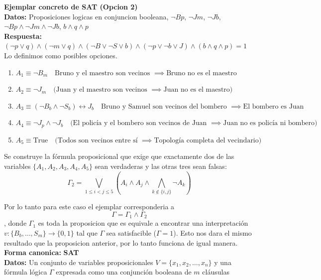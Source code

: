 \begin{enumerate}[label=\arabic*., leftmargin=*]
    \textbf{Ejemplar concreto de SAT (Opcion 2)}\\
    \textbf{Datos:} Proposiciones logicas en conjuncion booleana, $\neg Bp$, $\neg Jm$, $\neg Jb$, $\neg Bp \wedge \neg Jm \wedge \neg Jb$, $b \wedge q \wedge p$\\
    \textbf{Respuesta:} $(\neg p \vee q) \wedge (\neg m \vee q) \wedge (\neg B \vee \neg S \vee b) \wedge (\neg p \vee \neg b \vee J) \wedge (b \wedge q \wedge p) = 1$ \\
    Lo definimos como posibles opciones.\\
    \begin{enumerate}
    \item $A_1 \equiv \neg B_m \quad \text{Bruno y el maestro son vecinos } \implies \text{Bruno no es el maestro}$
    \item $A_2 \equiv \neg J_m \quad \text{(Juan y el maestro son vecinos } \implies \text{Juan no es el maestro)}$
    \item $A_3 \equiv (\neg B_b \wedge \neg S_b) \leftrightarrow J_b \quad \text{Bruno y Samuel son vecinos del bombero } \implies \text{El bombero es Juan }$
    \item $A_4 \equiv \neg J_p \wedge \neg J_b \quad \text{(El policía y el bombero son vecinos de Juan } \implies \text{Juan no es policía ni bombero)}$
    \item $A_5 \equiv \text{True} \quad \text{(Todos son vecinos entre sí } \implies \text{Topología completa del vecindario)}$
    \end{enumerate}
    
    Se construye la fórmula proposicional que exige que exactamente dos de las variables $\{A_1, A_2, A_3, A_4, A_5\}$ sean verdaderas y las otras tres sean falsas:$$\Gamma_2 = \bigvee_{1 \le i < j \le 5} \left( A_i \wedge A_j \wedge \bigwedge_{k \notin \{i,j\}} \neg A_k \right)$$

    Por lo tanto para este caso el ejemplar corresponderia a $$\Gamma = \Gamma_1 \wedge \Gamma_2$$, donde $\Gamma_1$ es toda la proposicion que es equivale a encontrar una interpretación $v : \{B_b, \dots, S_m\} \rightarrow \{0, 1\}$ tal que $\Gamma$ sea satisfacible ($\Gamma = 1$). Esto nos dara el mismo resultado que la proposicion anterior, por lo tanto funciona de igual manera.\\
    
    
    \textbf{Forma canonica:}
    \textbf{SAT}\\
    \textbf{Datos:} Un conjunto de variables proposicionales $V = \{x_1, x_2, \dots, x_n\}$ y una fórmula lógica $\Gamma$ expresada como una conjunción booleana de $m$ cláusulas


\end{enumerate}
